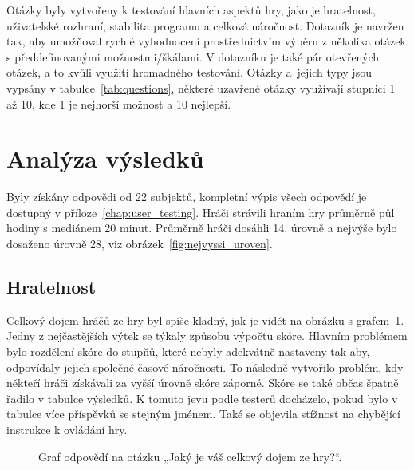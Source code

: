Otázky byly vytvořeny k testování hlavních aspektů hry, jako je hratelnost, uživatelské rozhraní, stabilita programu a celková náročnost. Dotazník je navržen tak, aby umožňoval rychlé vyhodnocení prostřednictvím výběru z několika otázek s předdefinovanými možnostmi/škálami. V dotazníku je také pár otevřených otázek, a to kvůli využití hromadného testování. Otázky a~jejich typy jsou vypsány v tabulce~\ref{tab:questions}, některé uzavřené otázky využívají stupnici 1 až 10, kde 1 je nejhorší možnost a 10 nejlepší.

\section{Analýza výsledků} \label{chap:Analýza výsledků}
Byly získány odpovědi od 22 subjektů, kompletní výpis všech odpovědí je dostupný v příloze~\ref{chap:user_testing}. Hráči strávili hraním hry průměrně půl hodiny s mediánem 20 minut. Průměrně hráči dosáhli 14. úrovně a nejvýše bylo dosaženo úrovně 28, viz obrázek~\ref{fig:nejvyssi_uroven}.

\subsection*{Hratelnost}
Celkový dojem hráčů ze hry byl spíše kladný, jak je vidět na obrázku s grafem~\ref{fig:hodnoceni_celkovy_dojem}. Jedny z nejčastějších výtek se týkaly způsobu výpočtu skóre. Hlavním problémem bylo rozdělení skóre do stupňů, které nebyly adekvátně nastaveny tak aby, odpovídaly jejich společné časové náročnosti. To následně vytvořilo problém, kdy někteří hráči získávali za vyšší úrovně skóre záporné. Skóre se také občas špatně řadilo v tabulce výsledků. K tomuto jevu podle testerů docházelo, pokud bylo v tabulce více příspěvků se stejným jménem. Také se objevila stížnost na chybějící instrukce k ovládání hry.

\begin{figure}[ht]
    \centering
    \caption{Graf odpovědí na otázku „Jaký je váš celkový dojem ze hry?“.}
    \label{fig:hodnoceni_celkovy_dojem}
\end{figure}


